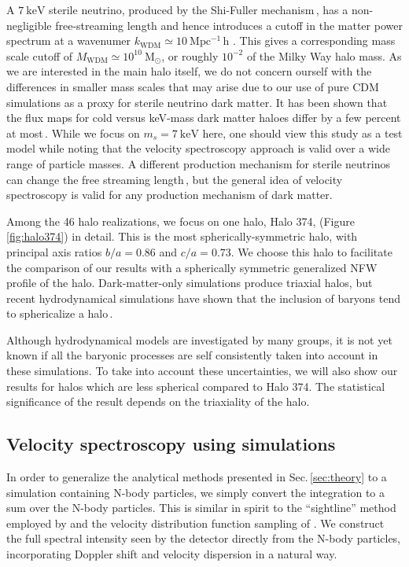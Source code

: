 \documentclass[aps,prd,10pt,twocolumn,superscriptaddress,showpacs]{revtex4-1}
\newcommand{\units}[1]{~\mathrm{#1}}
\begin{document}
A $7\units{keV}$ sterile neutrino, produced by the Shi-Fuller mechanism\,\cite{Shi:1998km}, has a non-negligible free-streaming length and hence introduces a cutoff in
the matter power spectrum at a wavenumer $k_\mathrm{WDM} \simeq 10 \units{Mpc^{-1}\,h}$
\cite{ven2016}. This gives a corresponding mass scale cutoff of $M_\mathrm{WDM} \simeq 10^{10}
\units{M_\odot}$, or roughly $10^{-2}$ of the Milky Way halo mass. As we are interested in the main
halo itself, we do not concern ourself with the differences in smaller mass scales that may
arise due to our use of pure CDM simulations as a proxy for sterile neutrino dark matter. 
It has been shown that the flux maps for cold versus keV-mass dark matter
haloes differ by a few percent at most\,\cite{Lovell:2014lea}. While we focus on $m_s=7\units{keV}$ here,
one should view this study as a test model while noting that the velocity spectroscopy approach is
valid over a wide range of particle masses.  A different production mechanism for sterile neutrinos can change the free streaming length\,\cite{Merle:2014xpa}, but the general idea of velocity spectroscopy is valid for any production mechanism of dark matter.

Among the 46 halo realizations, we focus on one halo, Halo 374, (Figure\,\ref{fig:halo374}) in detail. This is the most spherically-symmetric halo, with principal axis ratios $b/a=0.86$ and $c/a=0.73$.  We choose this halo to facilitate the comparison of our results with a spherically symmetric generalized NFW profile of the halo.  Dark-matter-only simulations produce triaxial halos, but recent hydrodynamical simulations have shown that the inclusion of baryons tend to sphericalize a halo\,\cite{Debattista:2007yz,Bryan:2012mw,Bernal:2014mmt,Bernal:2016guq}.

Although hydrodynamical models are investigated by many groups, it is not yet known if all the baryonic processes are self consistently taken into account in these simulations.  To take into account these uncertainties, we will also show our results for halos which are less spherical compared to Halo 374.  The statistical significance of the result depends on the triaxiality of the halo.


\subsection{Velocity spectroscopy using simulations}
\label{sec:simulations}

In order to generalize the analytical methods presented in Sec.\,\ref{sec:theory} to a simulation
containing N-body particles, we simply convert the integration to a sum over the N-body particles.
This is similar in spirit to the ``sightline'' method employed by \cite{Lovell:2014lea} and the
velocity distribution function sampling of \cite{Mao:2012hf}.  We construct the full spectral
intensity seen by the detector directly from the N-body particles, incorporating Doppler shift and
velocity dispersion in a natural way.   
\end{document}
